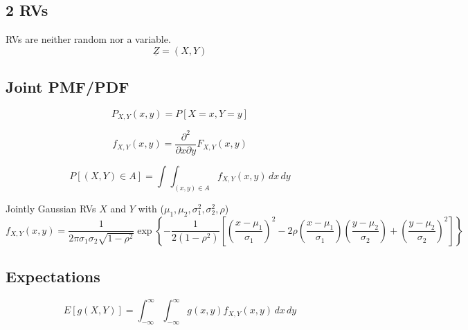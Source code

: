 \subsection{2 RVs}
\begin{notes}
    RVs are neither random nor a variable. 
    \begin{equation*}
        \underline{Z} = (X,Y)
    \end{equation*}
\end{notes}

\subsection{Joint PMF/PDF}
\begin{definition}
    \begin{equation}
    P_{X,Y}(x, y) = P[X = x, Y = y]
    \end{equation}
    
    \begin{equation}
    f_{X,Y}(x, y) = \frac{\partial^2}{\partial x \partial y} F_{X,Y}(x, y)
    \end{equation}
    
    \begin{equation}
    P[(X, Y) \in A] = \int \int_{(x, y) \in A} f_{X,Y}(x, y) \, dx \, dy
    \end{equation}
\end{definition}

\begin{example} Jointly Gaussian RVs $X$ and $Y$ with ($\mu_1, \mu_2, \sigma_1^2, \sigma_2^2, \rho$)
    \[
    f_{X,Y}(x, y) = \frac{1}{2\pi \sigma_1 \sigma_2 \sqrt{1-\rho^2}} 
    \exp \left\{ 
    -\frac{1}{2(1-\rho^2)} 
    \left[ 
    \left(\frac{x-\mu_1}{\sigma_1}\right)^2 
    - 2\rho \left(\frac{x-\mu_1}{\sigma_1}\right) \left(\frac{y-\mu_2}{\sigma_2}\right) 
    + \left(\frac{y-\mu_2}{\sigma_2}\right)^2 
    \right] 
    \right\}
    \]
\end{example}

\subsection{Expectations}
\begin{definition}
    \[
    E[g(X, Y)] = \int_{-\infty}^{\infty} \int_{-\infty}^{\infty} g(x, y) f_{X,Y}(x, y) \, dx \, dy
    \]
\end{definition}

